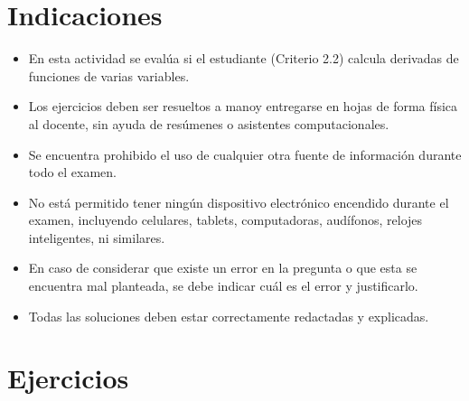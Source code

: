 \documentclass[11pt,respuestas,a4]{aleph-examen}
\begin{document}
\encabezado

\vspace{-5mm}
\section*{Indicaciones}
\begin{itemize}[leftmargin=*]
\item
    En esta actividad se evalúa si el estudiante (Criterio 2.2) calcula derivadas de funciones de varias variables.
\item
    Los ejercicios deben ser resueltos a manoy entregarse en hojas de forma física al docente, sin ayuda de resúmenes o asistentes computacionales.
\item
    Se encuentra prohibido el uso de cualquier otra fuente de información durante todo el examen.
\item
    No está permitido tener ningún dispositivo electrónico encendido durante el examen, incluyendo celulares, tablets, computadoras, audífonos, relojes inteligentes, ni similares.
\item
    En caso de considerar que existe un error en la pregunta o que esta se encuentra mal planteada, se debe indicar cuál es el error y justificarlo.
\item
    Todas las soluciones deben estar correctamente redactadas y explicadas.
\end{itemize}

\section*{Ejercicios}
\end{document}
